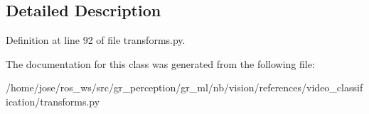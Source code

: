 \subsection{Detailed Description}


Definition at line 92 of file transforms.\+py.



The documentation for this class was generated from the following file\+:\begin{DoxyCompactItemize}
\item 
/home/jose/ros\+\_\+ws/src/gr\+\_\+perception/gr\+\_\+ml/nb/vision/references/video\+\_\+classification/transforms.\+py\end{DoxyCompactItemize}
